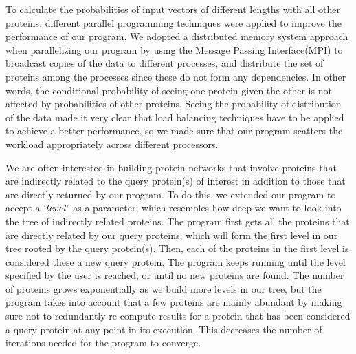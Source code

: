 \documentclass{ucetd}
\begin{document}
To calculate the probabilities of input vectors of different lengths with all other proteins, different parallel programming techniques were applied to improve the performance of our program.
We adopted a distributed memory system approach when parallelizing our program by using the Message Passing Interface(MPI) to broadcast copies of the data to different processes, and distribute the set of proteins among the processes since these do not form any dependencies. In other words, the conditional probability of seeing one protein given the other is not affected by probabilities of other proteins.
Seeing the probability of distribution of the data made it very clear that load balancing techniques have to be applied to achieve a better performance, so we made sure that our program scatters the workload appropriately across different processors. 

We are often interested in building protein networks that involve proteins that are indirectly related to the query protein(s) of interest in addition to those that are directly returned by our program. 
To do this, we extended our program to accept a $`level`$ as a parameter, which resembles how deep we want to  look into the tree of indirectly related proteins. The program first gets all the proteins that are directly related by our query proteins, which will form the first level in our tree rooted by the query protein(s). Then, each of the proteins in the first level is considered these a new query protein. The program keeps running until the level specified by the user is reached, or until no new proteins are found. The number of proteins grows exponentially as we build more levels in our tree, but the program takes into account that a few proteins are mainly abundant by making sure not to redundantly re-compute results for a protein that has been considered a query protein at any point in its execution. This decreases the number of iterations needed for the program to converge. 
\end{document}
